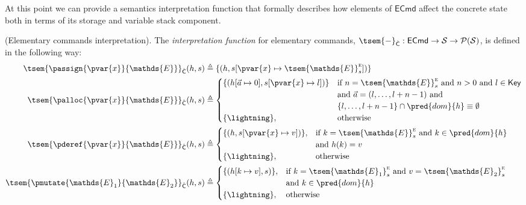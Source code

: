 At this point we can provide a semantics interpretation function that formally describes how elements of $\mathsf{ECmd}$ affect the concrete state both in terms of its storage and variable stack component.
\begin{defn}
	(Elementary commands interpretation).
	\label{ecmdint} The \emph{interpretation function} for elementary commands, $\tsem{-}_{\hat{\mathsf{C}}} : \mathsf{ECmd} \rightarrow \mathcal{S} \rightarrow \mathcal{P}(\mathcal{S})$, is defined in the following way:
	\begin{align*}
		\tsem{\passign{\pvar{x}}{\mathds{E}}}_{\hat{\mathsf{C}}}(h, s) &\triangleq \{ (h, s[\pvar{x} \mapsto \tsem{\mathds{E}}_s^\textsc{e}]) \}
		\\
		\tsem{\palloc{\pvar{x}}{\mathds{E}}}_{\hat{\mathsf{C}}}(h, s) &\triangleq
			\begin{cases}
				\{ (h[\vec{a} \mapsto 0], s[\pvar{x} \mapsto l]) \}
				&
				\text{if } n = \tsem{\mathds{E}}_s^\textsc{e} \text{ and } n > 0 \text{ and } l \in \mathsf{Key}\\ & \text{and } \vec{a} = (l, \ldots, l + n - 1) \text{ and } \\
				& \{ l, \ldots, l + n - 1 \} \cap \pred{dom}{h} \equiv \emptyset \\
				\{ \lightning \}, & \text{otherwise}
			\end{cases}
		\\
		\tsem{\pderef{\pvar{x}}{\mathds{E}}}_{\hat{\mathsf{C}}}(h, s) &\triangleq
			\begin{cases}
				\{ (h, s[\pvar{x} \mapsto v]) \}, & \text{if } k = \tsem{\mathds{E}}_s^\textsc{e} \text{ and } k \in \pred{dom}{h} \\ & \text{and } h(k) = v \\
				\{ \lightning \}, & \text{otherwise}
			\end{cases}
		\\
		\tsem{\pmutate{\mathds{E}_1}{\mathds{E}_2}}_{\hat{\mathsf{C}}}(h, s) &\triangleq
		\begin{cases}
			\{ (h[k \mapsto v], s) \}, & \text{if } k = \tsem{\mathds{E}_1}_s^\textsc{e} \text{ and } v = \tsem{\mathds{E}_2}_s^\textsc{e} \\ & \text{and } k \in \pred{dom}{h} \\
			\{ \lightning \}, & \text{otherwise}
		\end{cases}
	\end{align*}
\end{defn}
